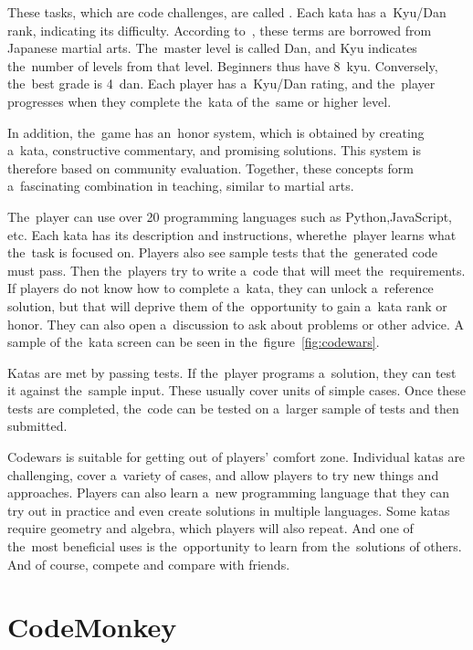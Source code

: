 These tasks, which are code challenges, are called .
Each kata has a~Kyu/Dan rank, indicating its difficulty.
According to~\cite{a2022_codewars}, these terms are borrowed from Japanese martial arts.
The~master level is called Dan, and Kyu indicates the~number of levels from that level.
Beginners thus have 8~kyu.
Conversely, the~best grade is 4~dan.
Each player has a~Kyu/Dan rating, and the~player progresses when they complete the~kata of the~same or higher level.

In addition, the~game has an~honor system, which is obtained by creating a~kata, constructive commentary, and promising solutions.
This system is therefore based on community evaluation.
Together, these concepts form a~fascinating combination in teaching, similar to martial arts.

The~player can use over 20 programming languages such as Python,\linebreak{}JavaScript, etc.
Each kata has its description and instructions, where\linebreak{}the~player learns what the~task is focused on.
Players also see sample tests that the~generated code must pass.
Then the~players try to write a~code that will meet the~requirements.
If players do not know how to complete a~kata, they can unlock a~reference solution, but that will deprive them of the~\mbox{opportunity} to gain a~kata rank or honor.
They can also open a~discussion to ask about problems or other advice.
A sample of the~kata screen can be seen in the~figure~\ref{fig:codewars}.

\pagebreak
Katas are met by passing tests.
If the~player programs a~solution, they can test it against the~sample input.
These usually cover units of simple cases.
Once these tests are completed, the~code can be tested on a~larger sample of tests and then submitted.

Codewars is suitable for getting out of players' comfort zone.
Individual katas are challenging, cover a~variety of cases, and allow players to try new things and approaches.
Players can also learn a~new programming language that they can try out in practice and even create solutions in multiple languages.
Some katas require geometry and algebra, which players will also repeat.
And one of the~most beneficial uses is the~opportunity to learn from the~solutions of others.
And of course, compete and compare with friends. 

\section{CodeMonkey}

